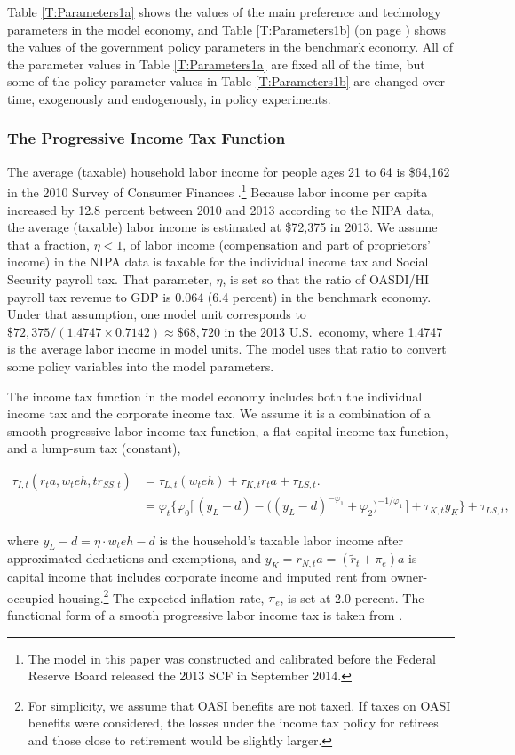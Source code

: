\documentclass[11pt,leqno,fleqn]{article}
\begin{document}
Table \ref{T:Parameters1a} shows the values of the main preference and technology parameters in the model economy, and Table \ref{T:Parameters1b} (on page \pageref{T:Parameters1b}) shows the values of the government policy parameters in the benchmark economy. All of the parameter values in Table \ref{T:Parameters1a} are fixed all of the time, but some of the policy parameter values in Table \ref{T:Parameters1b} are changed over time, exogenously and endogenously, in policy experiments.

\subsubsection{The Progressive Income Tax Function}
The average (taxable) household labor income for people ages 21 to 64 is \$64,162 in the 2010 Survey of Consumer Finances \citep{FRS:2012}.\footnote{The model in this paper was constructed and calibrated before the Federal Reserve Board released the 2013 SCF in September 2014.}  Because labor income per capita increased by 12.8 percent between 2010 and 2013 according to the NIPA data, the average (taxable) labor income is estimated at \$72,375 in 2013. We assume that a fraction, $\eta<1$, of labor income (compensation and part of proprietors' income) in the NIPA data is taxable for the individual income tax and Social Security payroll tax. That parameter, $\eta$, is set so that the ratio of OASDI/HI payroll tax revenue to GDP is 0.064 (6.4 percent) in the benchmark economy. Under that assumption, one model unit corresponds to $\$72,375/(1.4747\times 0.7142)\approx\$68,720$ in the 2013 U.S.\ economy, where 1.4747 is the average labor income in model units. The model uses that ratio to convert some policy variables into the model parameters.

The income tax function in the model economy includes both the individual income tax and the corporate income tax. We assume it is a combination of a smooth progressive labor income tax function, a flat capital income tax function, and a lump-sum tax (constant),

\begin{align*}
\tau_{I,t}(r_{t}a,w_{t}eh,tr_{SS,t})
&=\tau_{L,t}(w_{t}eh)+\tau_{K,t}r_{t}a+\tau_{LS,t}\Bigr.\\
&=\varphi_{t}\bigl\{\varphi_{0}\bigl[\,(y_{L}-d)-\bigl(
(y_{L}-d)^{-\varphi_{1}}+\varphi_{2}\bigr)^{-1/\varphi_{1}}\,\bigr]
+\tau_{K,t}y_{K}\bigr\}+\tau_{LS,t},
\end{align*}

where $y_{L}-d=\eta\!\cdot\!w_{t}eh-d$ is the household's taxable labor income after approximated deductions and exemptions, and $y_{K}=r_{N,t}a=(\tilde{r}_{t}+\pi_{e})a$ is capital income that includes corporate income and imputed rent from owner-occupied housing.\footnote{For simplicity, we assume that OASI benefits are not taxed. If taxes on OASI benefits were considered, the losses under the income tax policy for retirees and those close to retirement would be slightly larger.} The expected inflation rate, $\pi_{e}$, is set at 2.0 percent. The functional form of a smooth progressive labor income tax is taken from \citet{Gouveia.Strauss:1994}.
\end{document}
